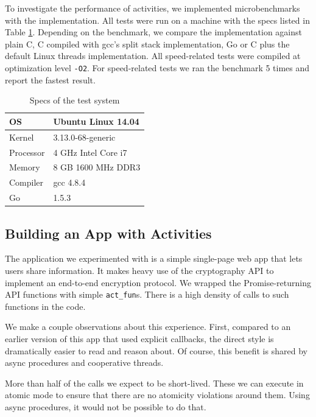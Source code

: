 \documentclass[9pt,preprint]{sigplanconf}
\begin{document}
To investigate the performance of activities, we implemented microbenchmarks with the \charcoal{} implementation.
All tests were run on a machine with the specs listed in Table \ref{table:specs}.
Depending on the benchmark, we compare the \charcoal{} implementation against plain C, C compiled with gcc's split stack implementation, Go or C plus the default Linux threads implementation.
All speed-related tests were compiled at optimization level \texttt{-O2}.
For speed-related tests we ran the benchmark 5 times and report the fastest result.

\begin{table}
  \centering
  \begin{tabular}{|l|l|}
    \hline
    OS & Ubuntu Linux 14.04 \\
    \hline
    Kernel & 3.13.0-68-generic \\
    \hline
    Processor & 4 GHz Intel Core i7 \\
    \hline
    Memory & 8 GB 1600 MHz DDR3 \\
    \hline
    Compiler & gcc 4.8.4 \\
    \hline
    Go & 1.5.3 \\
    \hline
  \end{tabular}
  \caption{Specs of the test system}
  \label{table:specs}
\end{table}

\subsection{Building an App with Activities}

The application we experimented with is a simple single-page web app that lets users share information.
It makes heavy use of the cryptography API to implement an end-to-end encryption protocol.
We wrapped the Promise-returning API functions with simple \texttt{act\_fun}s.
There is a high density of calls to such functions in the code.

We make a couple observations about this experience.
First, compared to an earlier version of this app that used explicit callbacks, the direct style is dramatically easier to read and reason about.
Of course, this benefit is shared by async procedures and cooperative threads.

More than half of the calls we expect to be short-lived.
These we can execute in atomic mode to ensure that there are no atomicity violations around them.
Using async procedures, it would not be possible to do that.
\end{document}
